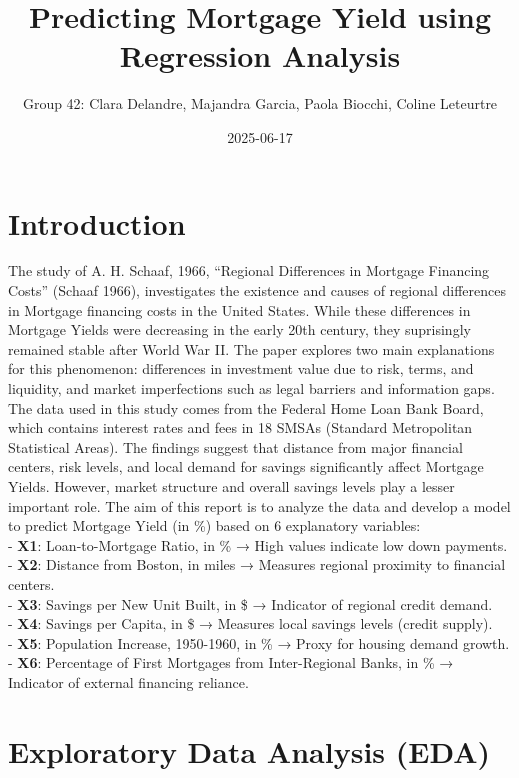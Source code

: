 \documentclass[
  12pt,
]{article}
\title{\textbf{Predicting Mortgage Yield using Regression Analysis}}
\author{Group 42: Clara Delandre, Majandra Garcia, Paola Biocchi, Coline
Leteurtre}
\date{2025-06-17}
\begin{document}
\maketitle

\section{Introduction}\label{introduction}

The study of A. H. Schaaf, 1966, ``Regional Differences in Mortgage
Financing Costs'' (Schaaf 1966), investigates the existence and causes
of regional differences in Mortgage financing costs in the United
States. While these differences in Mortgage Yields were decreasing in
the early 20th century, they suprisingly remained stable after World War
II. The paper explores two main explanations for this phenomenon:
differences in investment value due to risk, terms, and liquidity, and
market imperfections such as legal barriers and information gaps.
\vspace{0.5pt} The data used in this study comes from the Federal Home
Loan Bank Board, which contains interest rates and fees in 18 SMSAs
(Standard Metropolitan Statistical Areas). The findings suggest that
distance from major financial centers, risk levels, and local demand for
savings significantly affect Mortgage Yields. However, market structure
and overall savings levels play a lesser important role. \vspace{0.5pt}
The aim of this report is to analyze the data and develop a model to
predict Mortgage Yield (in \%) based on 6 explanatory variables:\\
- \textbf{X1}: Loan-to-Mortgage Ratio, in \% → High values indicate low
down payments.\\
- \textbf{X2}: Distance from Boston, in miles → Measures regional
proximity to financial centers.\\
- \textbf{X3}: Savings per New Unit Built, in \$ → Indicator of regional
credit demand.\\
- \textbf{X4}: Savings per Capita, in \$ → Measures local savings levels
(credit supply).\\
- \textbf{X5}: Population Increase, 1950-1960, in \% → Proxy for housing
demand growth.\\
- \textbf{X6}: Percentage of First Mortgages from Inter-Regional Banks,
in \% → Indicator of external financing reliance.

\section{Exploratory Data Analysis
(EDA)}\label{exploratory-data-analysis-eda}
\end{document}
